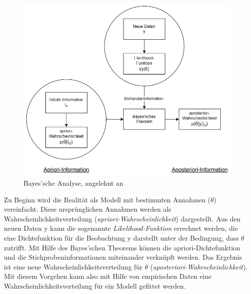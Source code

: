 \begin{figure}[H]
	\centering
	\includegraphics[scale = 0.8]{Bilder/bayesianInterence.png}
	\caption{Bayes'sche Analyse, angelehnt an \cite{nenning_bayessche_1980}}
	\label{fig:bayesianInference}
\end{figure}

Zu Beginn wird die Realität als Modell mit bestimmten Annahmen ($\theta$) vereinfacht.
Diese ursprünglichen Annahmen werden als Wahrscheinlichkeitsverteilung (\emph{apriori-Wahr\-schein\-lich\-keit}) dargestellt. 
Aus den neuen Daten y kann die sogenannte
\emph{Likelihood-Funktion} errechnet werden, die eine Dichtefunktion für die Beobachtung y darstellt unter der Bedingung, dass $\theta$ zutrifft.
Mit Hilfe des Bayes'schen Theorems können die apriori-Dichtefunktion und die Stichprobeninformationen miteinander verknüpft werden.
Das Ergebnis ist eine neue Wahrscheinlichkeitsverteilung für $\theta$ (\emph{aposteriori-Wahrscheinlichkeit}). \cite{nenning_bayessche_1980}
Mit diesem Vorgehen kann also mit Hilfe von empirischen Daten eine Wahrscheinlichkeitsverteilung für ein Modell gefittet werden.\\

